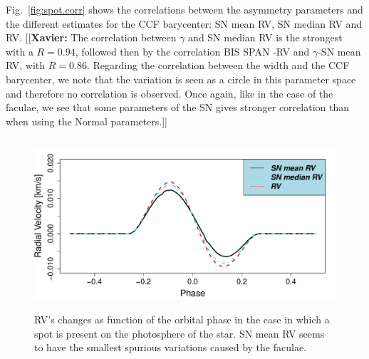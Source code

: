 \documentclass[11pt, oneside]{article}
\newcommand{\xavier}[1]{{\color{blue}[[\textbf{Xavier: }#1]]}}
\begin{document}
Fig.~\ref{fig:spot.corr} shows the correlations between the asymmetry parameters and the different estimates for the CCF barycenter: SN mean RV, SN median RV and RV. \xavier{The correlation between $\gamma$ and SN median RV is the strongest with a $R=0.94$, followed then by the correlation BIS SPAN -RV and $\gamma$-SN mean RV, with $R=0.86$. Regarding the correlation between the width and the CCF barycenter, we note that the variation is seen as a circle in this parameter space and therefore no correlation is observed. Once again, like in the case of the faculae, we see that some parameters of the SN gives stronger correlation than when using the Normal parameters.}

\begin{figure}[htbp]
   \centering
\includegraphics[height = 2.5in]{RV_comparison_SPOT.pdf} 
\caption{RV's changes as function of the orbital phase in the case in which a spot is present on the photosphere of the star. SN mean RV seems to have the smallest spurious variations caused by the faculae.}
    \label{fig:spot}
\end{figure}
\end{document}

